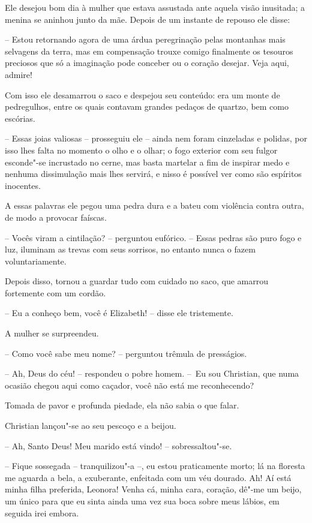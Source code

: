 Ele desejou bom dia à mulher que estava assustada ante aquela visão
inusitada; a menina se aninhou junto da mãe. Depois de um instante de
repouso ele disse:

-- Estou retornando agora de uma árdua peregrinação pelas montanhas
mais selvagens da terra, mas em compensação trouxe comigo finalmente os
tesouros preciosos que só a imaginação pode conceber ou o coração 
desejar. Veja aqui, admire!

Com isso ele desamarrou o saco e despejou seu conteúdo: era um monte de
pedregulhos, entre os quais contavam grandes pedaços de quartzo, bem
como escórias.

-- Essas joias valiosas -- prosseguiu ele -- ainda nem foram
cinzeladas e polidas, por isso lhes falta no momento o olho e o olhar;
o fogo exterior com seu fulgor esconde"-se incrustado no cerne, mas basta
 martelar a fim de inspirar medo e nenhuma
dissimulação mais lhes servirá, e nisso é possível ver como são 
espíritos inocentes.

A essas palavras ele pegou uma pedra dura e a bateu com violência contra
outra, de modo a provocar faíscas.

-- Vocês viram a cintilação? -- perguntou eufórico. -- Essas pedras são
puro fogo e luz, iluminam as trevas com seus sorrisos, no entanto nunca
o fazem voluntariamente.

Depois disso, tornou a guardar tudo com cuidado no saco, que amarrou
fortemente com um cordão.

-- Eu a conheço bem, você é Elizabeth! -- disse ele tristemente.

A mulher se surpreendeu.

-- Como você sabe meu nome? -- perguntou trêmula de presságios.

-- Ah, Deus do céu! -- respondeu o pobre homem. \mbox{-- Eu} sou Christian, que
numa ocasião chegou aqui como caçador, você não está me reconhecendo?

Tomada de pavor e profunda piedade, ela não sabia o que falar.

Christian lançou"-se ao seu pescoço e a beijou.

-- Ah, Santo Deus! Meu marido está vindo! -- sobressaltou"-se.

-- Fique sossegada -- tranquilizou"-a --, eu estou praticamente morto; lá
na floresta me aguarda a bela, a exuberante, enfeitada com um véu
dourado. Ah! Aí está minha filha preferida, Leonora! Venha cá, minha
cara, coração, dê"-me um beijo, um único para que eu sinta ainda uma vez
sua boca sobre meus lábios, em seguida irei embora.


